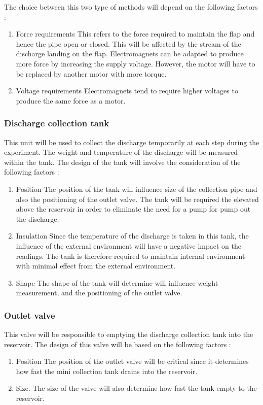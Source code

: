 \par
The choice between this two type of methods will depend on the following factors :
\begin{enumerate}
    \item Force requirements \newline
    This refers to the force required to maintain the flap and hence the pipe open or closed. This will be affected by the stream of the discharge landing on the flap. Electromagnets can be adapted to produce more force by increasing the supply voltage. However, the motor will have to be replaced by another motor with more torque.
    \item Voltage requirements \newline
    Electromagnets tend to require higher voltages to produce the same force as a motor.
\end{enumerate}
\subsubsection{Discharge collection tank}
This unit will be used to collect the discharge temporarily at each step during the experiment. The weight and temperature of the discharge will be measured within the tank. The design of the tank will involve the consideration of the following factors :
\begin{enumerate}
    \item Position \newline
    The position of the tank will influence size of the collection pipe and also the positioning of the outlet valve. The tank will be required the elevated above the reservoir in order to eliminate the need for a pump for pump out the discharge. 
    \item Insulation \newline
    Since the temperature of the discharge is taken in this tank, the influence of the external environment will have a negative impact on the readings. The tank is therefore required to maintain internal environment with minimal effect from the external environment. 
    \item Shape \newline 
     The shape of the tank will determine will influence weight measurement, and the positioning of the outlet valve.
\end{enumerate}
\subsubsection{Outlet valve}
This valve will be responsible to emptying the discharge collection tank into the reservoir. The design of this valve will be based on the following factors :
\begin{enumerate}
    \item Position \newline 
    The position of the outlet valve will be critical since it determines how fast the mini collection tank drains into the reservoir.
    \item Size. \newline
    The size of the valve will also determine how fast the tank empty to the reservoir. 
\end{enumerate}
